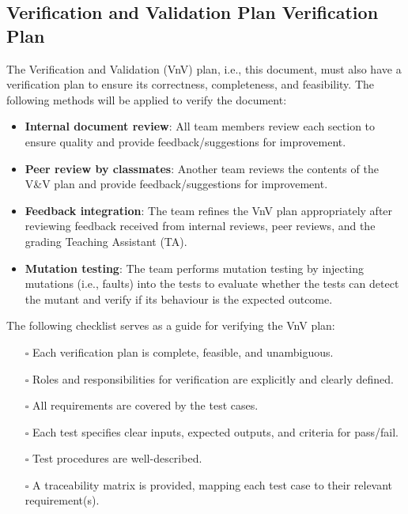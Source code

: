 \documentclass[12pt, titlepage]{article}
\begin{document}
\subsection{Verification and Validation Plan Verification Plan}
The Verification and Validation (VnV) plan, i.e., this document, must also have
a verification plan to ensure its correctness, completeness, and feasibility.
The following methods will be applied to verify the document:
\begin{itemize}
  \item \textbf{Internal document review}: All team members review each section
  to ensure quality and provide feedback/suggestions for improvement.
  \item \textbf{Peer review by classmates}: Another team reviews the contents of
  the V\&V plan and provide feedback/suggestions for improvement.
  \item \textbf{Feedback integration}: The team refines the VnV plan
  appropriately after reviewing feedback received from internal reviews, peer
  reviews, and the grading Teaching Assistant (TA).
  \item \textbf{Mutation testing}: The team performs mutation testing by
  injecting mutations (i.e., faults) into the tests to evaluate whether the
  tests can detect the mutant and verify if its behaviour is the expected
  outcome.
\end{itemize}
The following checklist serves as a guide for verifying the VnV plan:
\begin{itemize}
  \item[$\square$] Each verification plan is complete, feasible, and
  unambiguous.
  \item[$\square$] Roles and responsibilities for verification are explicitly
  and clearly defined.
  \item[$\square$] All requirements are covered by the test cases.
  \item[$\square$] Each test specifies clear inputs, expected outputs, and
  criteria for pass/fail.
  \item[$\square$] Test procedures are well-described.
  \item[$\square$] A traceability matrix is provided, mapping each test case to
  their relevant requirement(s).
\end{itemize}
\end{document}
